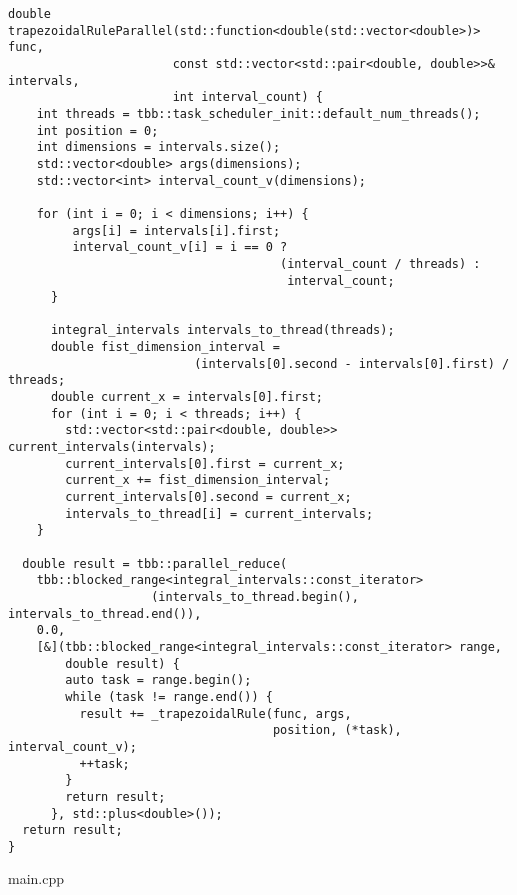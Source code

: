 \documentclass{report}
\begin{document}
\begin{lstlisting}
double trapezoidalRuleParallel(std::function<double(std::vector<double>)> func,
                       const std::vector<std::pair<double, double>>& intervals,
                       int interval_count) {
    int threads = tbb::task_scheduler_init::default_num_threads();
    int position = 0;
    int dimensions = intervals.size();
    std::vector<double> args(dimensions);
    std::vector<int> interval_count_v(dimensions);

    for (int i = 0; i < dimensions; i++) {
         args[i] = intervals[i].first;
         interval_count_v[i] = i == 0 ?
                                      (interval_count / threads) :
                                       interval_count;
      }

      integral_intervals intervals_to_thread(threads);
      double fist_dimension_interval =
                          (intervals[0].second - intervals[0].first) / threads;
      double current_x = intervals[0].first;
      for (int i = 0; i < threads; i++) {
        std::vector<std::pair<double, double>> current_intervals(intervals);
        current_intervals[0].first = current_x;
        current_x += fist_dimension_interval;
        current_intervals[0].second = current_x;
        intervals_to_thread[i] = current_intervals;
    }

  double result = tbb::parallel_reduce(
    tbb::blocked_range<integral_intervals::const_iterator>
                    (intervals_to_thread.begin(), intervals_to_thread.end()),
    0.0,
    [&](tbb::blocked_range<integral_intervals::const_iterator> range,
        double result) {
        auto task = range.begin();
        while (task != range.end()) {
          result += _trapezoidalRule(func, args,
                                     position, (*task), interval_count_v);
          ++task;
        }
        return result;
      }, std::plus<double>());
  return result;
}
\end{lstlisting}
main.cpp
\end{document}
